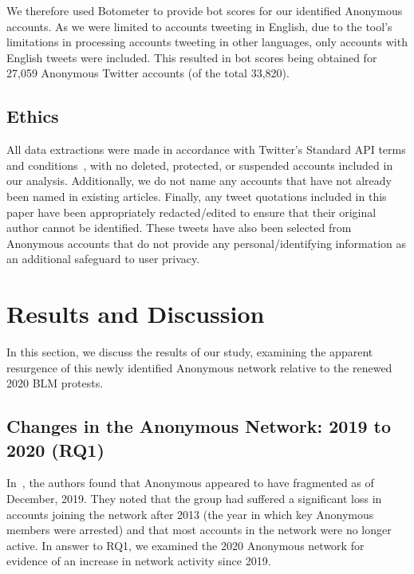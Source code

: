 \documentclass[letterpaper]{article}
\begin{document}
We therefore used Botometer to provide bot scores for our identified Anonymous accounts. As we were limited to accounts tweeting in English, due to the tool's limitations in processing accounts tweeting in other languages, only accounts with English tweets were included. This resulted in bot scores being obtained for 27,059 Anonymous Twitter accounts (of the total 33,820).

\subsection{Ethics}

All data extractions were made in accordance with Twitter's Standard API terms and conditions~\cite{TwitterDev}, with no deleted, protected, or suspended accounts included in our analysis. Additionally, we do not name any accounts that have not already been named in existing articles. Finally, any tweet quotations included in this paper have been appropriately redacted/edited to ensure that their original author cannot be identified. These tweets have also been selected from Anonymous accounts that do not provide any personal/identifying information as an additional safeguard to user privacy.

\section{Results and Discussion}

In this section, we discuss the results of our study, examining the apparent resurgence of this newly identified Anonymous network relative to the renewed 2020 BLM protests.

\subsection{Changes in the Anonymous Network: 2019 to 2020 (RQ1)}

In~\cite{Jones2020}, the authors found that Anonymous appeared to have fragmented as of December, 2019. They noted that the group had suffered a significant loss in accounts joining the network after 2013 (the year in which key Anonymous members were arrested) and that most accounts in the network were no longer active. In answer to RQ1, we examined the 2020 Anonymous network for evidence of an increase in network activity since 2019.
\end{document}
